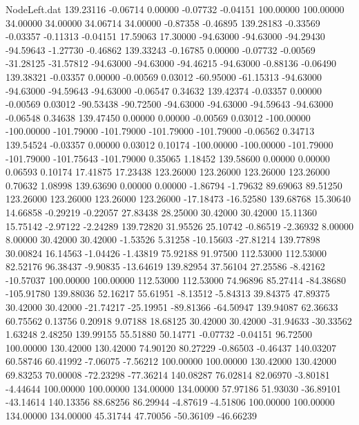 \begin{filecontents}{NodeLeft.dat}
 139.23116   -0.06714    0.00000    -0.07732   -0.04151  100.00000  100.00000   34.00000   34.00000   34.06714   34.00000   -0.87358   -0.46895
 139.28183   -0.33569   -0.03357    -0.11313   -0.04151   17.59063   17.30000  -94.63000  -94.63000  -94.29430  -94.59643   -1.27730   -0.46862
 139.33243   -0.16785    0.00000    -0.07732   -0.00569  -31.28125  -31.57812  -94.63000  -94.63000  -94.46215  -94.63000   -0.88136   -0.06490
 139.38321   -0.03357    0.00000    -0.00569    0.03012  -60.95000  -61.15313  -94.63000  -94.63000  -94.59643  -94.63000   -0.06547    0.34632
 139.42374   -0.03357    0.00000    -0.00569    0.03012  -90.53438  -90.72500  -94.63000  -94.63000  -94.59643  -94.63000   -0.06548    0.34638
 139.47450    0.00000    0.00000    -0.00569    0.03012 -100.00000 -100.00000 -101.79000 -101.79000 -101.79000 -101.79000   -0.06562    0.34713
 139.54524   -0.03357    0.00000     0.03012    0.10174 -100.00000 -100.00000 -101.79000 -101.79000 -101.75643 -101.79000    0.35065    1.18452
 139.58600    0.00000    0.00000     0.06593    0.10174   17.41875   17.23438  123.26000  123.26000  123.26000  123.26000    0.70632    1.08998
 139.63690    0.00000    0.00000    -1.86794   -1.79632   89.69063   89.51250  123.26000  123.26000  123.26000  123.26000  -17.18473  -16.52580
 139.68768   15.30640   14.66858    -0.29219   -0.22057   27.83438   28.25000   30.42000   30.42000   15.11360   15.75142   -2.97122   -2.24289
 139.72820   31.95526   25.10742    -0.86519   -2.36932    8.00000    8.00000   30.42000   30.42000   -1.53526    5.31258  -10.15603  -27.81214
 139.77898   30.00824   16.14563    -1.04426   -1.43819   75.92188   91.97500  112.53000  112.53000   82.52176   96.38437   -9.90835  -13.64619
 139.82954   37.56104   27.25586    -8.42162  -10.57037  100.00000  100.00000  112.53000  112.53000   74.96896   85.27414  -84.38680 -105.91780
 139.88036   52.16217   55.61951    -8.13512   -5.84313   39.84375   47.89375   30.42000   30.42000  -21.74217  -25.19951  -89.81366  -64.50947
 139.94087   62.36633   60.75562     0.13756    0.20918    9.07188   18.68125   30.42000   30.42000  -31.94633  -30.33562    1.63248    2.48250
 139.99155   55.51880   50.14771    -0.07732   -0.04151   96.72500  100.00000  130.42000  130.42000   74.90120   80.27229   -0.86503   -0.46437
 140.03207   60.58746   60.41992    -7.06075   -7.56212  100.00000  100.00000  130.42000  130.42000   69.83253   70.00008  -72.23298  -77.36214
 140.08287   76.02814   82.06970    -3.80181   -4.44644  100.00000  100.00000  134.00000  134.00000   57.97186   51.93030  -36.89101  -43.14614
 140.13356   88.68256   86.29944    -4.87619   -4.51806  100.00000  100.00000  134.00000  134.00000   45.31744   47.70056  -50.36109  -46.66239

\end{filecontents}
